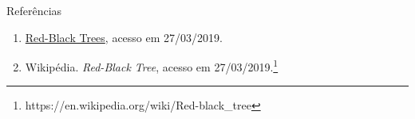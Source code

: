 \begin{frame}[fragile]{Referências}

    \begin{enumerate}
        \item \href{https://www.cs.usfca.edu/~galles/visualization/RedBlack.html}{Red-Black Trees}, acesso em 27/03/2019.

        \item Wikipédia. \textit{Red-Black Tree}, acesso em 27/03/2019.\footnote{https://en.wikipedia.org/wiki/Red-black\_tree}

    \end{enumerate}

\end{frame}
